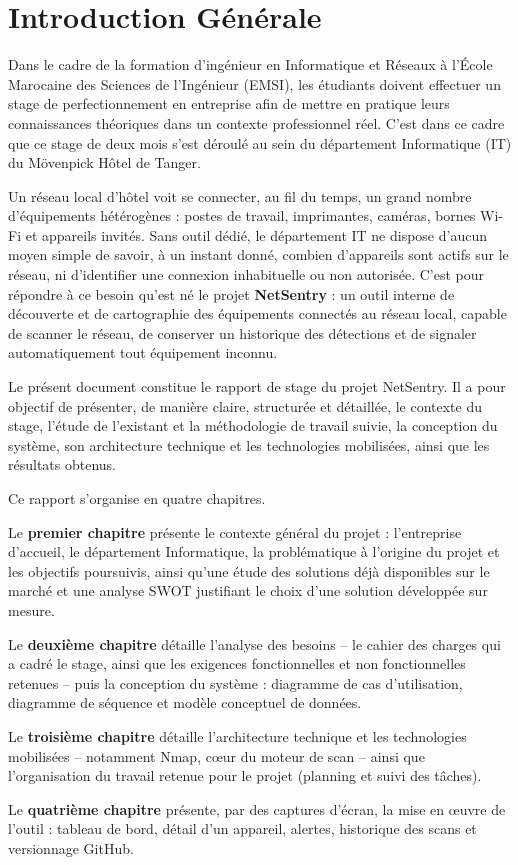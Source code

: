 \chapter*{Introduction Générale}
\label{chapter:introduction}

Dans le cadre de la formation d'ingénieur en Informatique et Réseaux à l'École Marocaine
des Sciences de l'Ingénieur (EMSI), les étudiants doivent effectuer un stage de
perfectionnement en entreprise afin de mettre en pratique leurs connaissances théoriques
dans un contexte professionnel réel. C'est dans ce cadre que ce stage de deux mois s'est
déroulé au sein du département Informatique (IT) du Mövenpick Hôtel de Tanger.

Un réseau local d'hôtel voit se connecter, au fil du temps, un grand nombre
d'équipements hétérogènes : postes de travail, imprimantes, caméras, bornes Wi-Fi et
appareils invités. Sans outil dédié, le département IT ne dispose d'aucun moyen simple
de savoir, à un instant donné, combien d'appareils sont actifs sur le réseau, ni
d'identifier une connexion inhabituelle ou non autorisée. C'est pour répondre à ce
besoin qu'est né le projet \textbf{NetSentry} : un outil interne de découverte et de
cartographie des équipements connectés au réseau local, capable de scanner le réseau, de
conserver un historique des détections et de signaler automatiquement tout équipement
inconnu.

Le présent document constitue le rapport de stage du projet NetSentry. Il a pour objectif
de présenter, de manière claire, structurée et détaillée, le contexte du stage, l'étude
de l'existant et la méthodologie de travail suivie, la conception du système, son
architecture technique et les technologies mobilisées, ainsi que les résultats obtenus.

Ce rapport s'organise en quatre chapitres.

Le \textbf{premier chapitre} présente le contexte général du projet : l'entreprise
d'accueil, le département Informatique, la problématique à l'origine du projet et les
objectifs poursuivis, ainsi qu'une étude des solutions déjà disponibles sur le marché et
une analyse SWOT justifiant le choix d'une solution développée sur mesure.

Le \textbf{deuxième chapitre} détaille l'analyse des besoins -- le cahier des charges qui
a cadré le stage, ainsi que les exigences fonctionnelles et non fonctionnelles retenues
-- puis la conception du système : diagramme de cas d'utilisation, diagramme de séquence
et modèle conceptuel de données.

Le \textbf{troisième chapitre} détaille l'architecture technique et les technologies
mobilisées -- notamment Nmap, c\oe{}ur du moteur de scan -- ainsi que l'organisation du
travail retenue pour le projet (planning et suivi des tâches).

Le \textbf{quatrième chapitre} présente, par des captures d'écran, la mise en \oe{}uvre de
l'outil : tableau de bord, détail d'un appareil, alertes, historique des scans et
versionnage GitHub.
